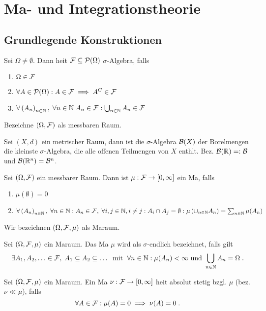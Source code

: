 \chapter{Ma\s{}- und Integrationstheorie}
\section{Grundlegende Konstruktionen}
\begin{definition}
	Sei \(\Omega \neq \emptyset\). Dann hei\s t \(\mathcal{F} \subseteq \mathcal{P} (\Omega)\)  $\sigma$-Algebra, falls
	\begin{enumerate}[noitemsep]
		\item \(\Omega \in \mathcal{F}\)
		\item \(\forall A \in \mathcal{P}(\Omega): A\in \mathcal{F} \implies A^C \in \mathcal{F}\)
		\item \(\forall \left (A_n\right )_{n\in \mathbb{N}},\; \forall n\in \mathbb{N}\; A_n \in \mathcal{F}: \bigcup_{n\in\mathbb{N}}A_n\in\mathcal{F}\)
	\end{enumerate}
	Bezeichne \((\Omega, \mathcal{F})\) als messbaren Raum.
\end{definition}
\begin{rem}
	Sei \((X, d)\) ein metrischer Raum, dann ist die $\sigma$-Algebra \(\mathcal{B}(X)\) der Borelmengen die kleinste $\sigma$-Algebra, die alle offenen Teilmengen von $X$ enth\as lt. Bez. \(\mathcal{B}(\mathbb{R}) =: \mathcal{B}\) und \(\mathcal{B}(\mathbb{R}^n) = \mathcal{B}^n\).
\end{rem}
\begin{definition}
	Sei \((\Omega, \mathcal{F})\) ein messbarer Raum. Dann ist \(\mu: \mathcal{F} \to [0,\infty]\) ein Ma\s{}, falls
	\begin{enumerate}[noitemsep]
		\item \(\mu(\emptyset) = 0\)
		\item \(\forall \left (A_n\right )_{n\in \mathbb{N}}, \; \forall n\in\mathbb{N}: A_n \in \mathcal{F}, \; \forall i, j \in \mathbb{N}, i\neq j: A_i\cap A_j = \emptyset: \mu\left( \cup_{n\in\mathbb{N}} A_n\right) = \sum_{n\in\mathbb{N}} \mu(A_n)\)
	\end{enumerate}
	Wir bezeichnen \((\Omega, \mathcal{F}, \mu)\) als Ma\s raum.
\end{definition}
\begin{definition}
	Sei \((\Omega, \mathcal{F}, \mu)\) ein Ma\s raum. Das Ma\s{} $\mu$ wird als $\sigma$-endlich bezeichnet, falls gilt
	\[\exists A_1, A_2,\ldots \in \mathcal{F},\; A_1\subseteq A_2\subseteq \ldots \;\text{ mit }\; \forall n \in \mathbb{N}: \mu(A_n) < \infty \text{ und } \bigcup_{n\in \mathbb{N}}A_n = \Omega\;.\]
\end{definition}
\begin{definition}
	Sei \((\Omega, \mathcal{F}, \mu)\) ein Ma\s raum. Ein Ma\s{} \(\nu: \mathcal{F} \to [0,\infty]\) hei\s t absolut stetig bzgl. \(\mu\) (bez. \(\nu \ll \mu\)), falls 
	\[\forall A\in \mathcal{F}: \mu(A) = 0 \implies \nu(A) = 0\;.\]
\end{definition}

